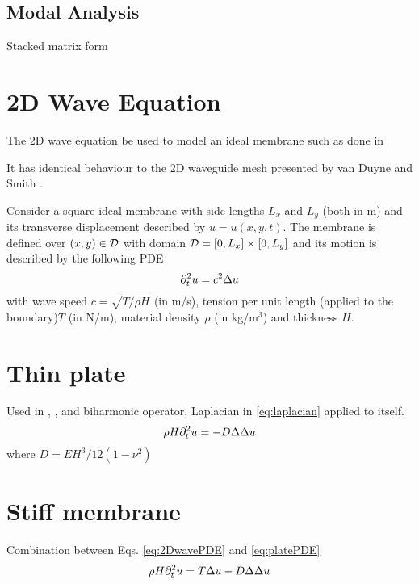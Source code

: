 \subsection{Modal Analysis}
Stacked matrix form

\section{2D Wave Equation}
The 2D wave equation be used to model an ideal membrane such as done in 

It has identical behaviour to the 2D waveguide mesh presented by van Duyne and Smith \cite{Duyne1993}.

Consider a square ideal membrane with side lengths $L_x$ and $L_y$ (both in m) and its transverse displacement described by $u = u(x,y,t)$. The membrane is defined over $(x,y) \in \mathcal{D}$ with domain $\mathcal{D} = [0, L_x] \times[0, L_y]$ and its motion is described by the following PDE
\begin{equation}\label{eq:2DwavePDE}
    \partial_t^2 u = c^2\Delta u
\end{equation}
with wave speed $c = \sqrt{T/\rho H}$ (in m/s), tension per unit length (applied to the boundary)$T$ (in N/m), material density $\rho$ (in kg/m$^3$) and thickness $H$.

\section{Thin plate}
Used in \citeP[A], \citeP[B], \citeP[D] and \citeP[E]
biharmonic operator, Laplacian in \eqref{eq:laplacian} applied to itself.
\begin{equation}\label{eq:platePDE}
    \rho H \partial_t^2 u = -D\Delta\Delta u
\end{equation}
where $D = EH^3/12(1-\nu^2)$
\section{Stiff membrane}
Combination between Eqs. \eqref{eq:2DwavePDE} and \eqref{eq:platePDE}
\begin{equation}\label{eq:2DwavePDE}
    \rho H \partial_t^2 u = T\Delta u - D
    \Delta\Delta u
\end{equation}
\citeP[F]